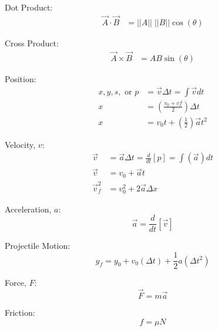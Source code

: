 \documentclass[10pt, letterpaper]{book}
\begin{document}
    \begin{multicols*}{2}
        Dot Product:
        \begin{align}
            \vec{A}\cdot\vec{B} & = ||A|| \; ||B||\cos(\theta)
        \end{align}

        Cross Product:
        \begin{align}
            \vec{A}\times\vec{B} & = AB\sin(\theta)
        \end{align}

        Position:
        \begin{align}
            x, y, s, \text{ or } p  & = \vec{v}\Delta t = \int\vec{v}dt                     \\
                                 x  & = \left(\frac{v_{0}+v{f}}{2}\right)\Delta t           \\
                                 x  & = v_{0} t+\left(\frac{1}{2}\right)\vec{a} t^{2}       
        \end{align}

        Velocity, $v$:
        \begin{align}
            \vec{v}         & = \vec{a}\Delta t = \frac{d}{dt}[p] = \int(\vec{a})dt     \\
            \vec{v}         & = v_{0} + \vec{a}t                                        \\
            \vec{v}^{2}_{f} & = v^{2}_{0} + 2\vec{a}\Delta x                            
        \end{align}

        Acceleration, $a$:
        \begin{equation}
            \vec{a} = \frac{d}{dt}[\vec{v}]
        \end{equation}

        Projectile Motion:
        \begin{equation}
            \label{eqn::yfinal}
            y_{f} = y_{0} + v_{0}(\Delta t) + \frac{1}{2}a(\Delta t^{2})
        \end{equation}

        Force, $F$:
        \begin{equation}
            \vec{F} = m\vec{a}
        \end{equation}

        Friction:
        \begin{equation}
            f = \mu N
        \end{equation}


\end{multicols*}
\end{document}
